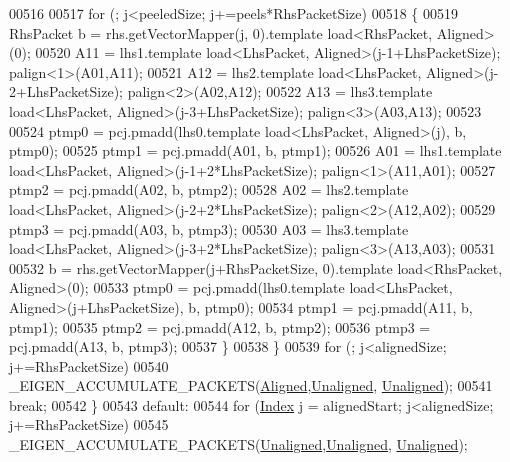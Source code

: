 \begin{DoxyCode}
{{00516 
00517               \textcolor{keywordflow}{for} (; j<peeledSize; j+=peels*RhsPacketSize)
00518               \{
00519                 RhsPacket b = rhs.getVectorMapper(j, 0).template load<RhsPacket, Aligned>(0);
00520                 A11 = lhs1.template load<LhsPacket, Aligned>(j-1+LhsPacketSize);  palign<1>(A01,A11);
00521                 A12 = lhs2.template load<LhsPacket, Aligned>(j-2+LhsPacketSize);  palign<2>(A02,A12);
00522                 A13 = lhs3.template load<LhsPacket, Aligned>(j-3+LhsPacketSize);  palign<3>(A03,A13);
00523 
00524                 ptmp0 = pcj.pmadd(lhs0.template load<LhsPacket, Aligned>(j), b, ptmp0);
00525                 ptmp1 = pcj.pmadd(A01, b, ptmp1);
00526                 A01 = lhs1.template load<LhsPacket, Aligned>(j-1+2*LhsPacketSize);  palign<1>(A11,A01);
00527                 ptmp2 = pcj.pmadd(A02, b, ptmp2);
00528                 A02 = lhs2.template load<LhsPacket, Aligned>(j-2+2*LhsPacketSize);  palign<2>(A12,A02);
00529                 ptmp3 = pcj.pmadd(A03, b, ptmp3);
00530                 A03 = lhs3.template load<LhsPacket, Aligned>(j-3+2*LhsPacketSize);  palign<3>(A13,A03);
00531 
00532                 b = rhs.getVectorMapper(j+RhsPacketSize, 0).template load<RhsPacket, Aligned>(0);
00533                 ptmp0 = pcj.pmadd(lhs0.template load<LhsPacket, Aligned>(j+LhsPacketSize), b, ptmp0);
00534                 ptmp1 = pcj.pmadd(A11, b, ptmp1);
00535                 ptmp2 = pcj.pmadd(A12, b, ptmp2);
00536                 ptmp3 = pcj.pmadd(A13, b, ptmp3);
00537               \}
00538             \}
00539             \textcolor{keywordflow}{for} (; j<alignedSize; j+=RhsPacketSize)
00540               \_EIGEN\_ACCUMULATE\_PACKETS(\hyperlink{group__enums_gga45fe06e29902b7a2773de05ba27b47a1ad37d4c71425bb286e9b4103830538fbf}{Aligned},\hyperlink{group__enums_gga45fe06e29902b7a2773de05ba27b47a1ac935220b4c844108e183ebe30a4d5204}{Unaligned},
      \hyperlink{group__enums_gga45fe06e29902b7a2773de05ba27b47a1ac935220b4c844108e183ebe30a4d5204}{Unaligned});
00541             \textcolor{keywordflow}{break};
00542           \}
00543           \textcolor{keywordflow}{default}:
00544             \textcolor{keywordflow}{for} (\hyperlink{namespace_eigen_a62e77e0933482dafde8fe197d9a2cfde}{Index} j = alignedStart; j<alignedSize; j+=RhsPacketSize)
00545               \_EIGEN\_ACCUMULATE\_PACKETS(\hyperlink{group__enums_gga45fe06e29902b7a2773de05ba27b47a1ac935220b4c844108e183ebe30a4d5204}{Unaligned},\hyperlink{group__enums_gga45fe06e29902b7a2773de05ba27b47a1ac935220b4c844108e183ebe30a4d5204}{Unaligned},
      \hyperlink{group__enums_gga45fe06e29902b7a2773de05ba27b47a1ac935220b4c844108e183ebe30a4d5204}{Unaligned});
}}
\end{DoxyCode}
